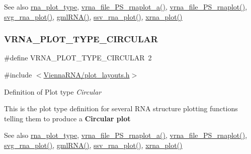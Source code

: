 \begin{DoxySeeAlso}{See also}
\hyperlink{group__plotting__utils_ga5964c4581431b098b80027d6e14dcdd4}{rna\+\_\+plot\+\_\+type}, \hyperlink{plot__structure_8h_a139a31dd0ba9fc6612431f67de901c31}{vrna\+\_\+file\+\_\+\+P\+S\+\_\+rnaplot\+\_\+a()}, \hyperlink{plot__structure_8h_abdc8f6548ba4a3bc3cd868ccbcfdb86a}{vrna\+\_\+file\+\_\+\+P\+S\+\_\+rnaplot()}, \hyperlink{plot__structure_8h_ae7853539b5df98f294b4af434e979304}{svg\+\_\+rna\+\_\+plot()}, \hyperlink{plot__structure_8h_a70834bc8c0aad4fe6824ff76ccb8f329}{gml\+R\+N\+A()}, \hyperlink{plot__structure_8h_add368528755f9a830727b680243541df}{ssv\+\_\+rna\+\_\+plot()}, \hyperlink{plot__structure_8h_a2f6d5953e6a323df898896b8d6614483}{xrna\+\_\+plot()} 
\end{DoxySeeAlso}
\mbox{\label{group__plotting__utils_ga8c9eac631348da92136c8363ecdd9fb9}} 
\subsubsection{\texorpdfstring{V\+R\+N\+A\+\_\+\+P\+L\+O\+T\+\_\+\+T\+Y\+P\+E\+\_\+\+C\+I\+R\+C\+U\+L\+AR}{VRNA\_PLOT\_TYPE\_CIRCULAR}}
{\footnotesize\ttfamily \#define V\+R\+N\+A\+\_\+\+P\+L\+O\+T\+\_\+\+T\+Y\+P\+E\+\_\+\+C\+I\+R\+C\+U\+L\+AR~2}



{\ttfamily \#include $<$\hyperlink{plot__layouts_8h}{Vienna\+R\+N\+A/plot\+\_\+layouts.\+h}$>$}



Definition of Plot type {\itshape Circular} 

This is the plot type definition for several R\+NA structure plotting functions telling them to produce a {\bfseries Circular plot}

\begin{DoxySeeAlso}{See also}
\hyperlink{group__plotting__utils_ga5964c4581431b098b80027d6e14dcdd4}{rna\+\_\+plot\+\_\+type}, \hyperlink{plot__structure_8h_a139a31dd0ba9fc6612431f67de901c31}{vrna\+\_\+file\+\_\+\+P\+S\+\_\+rnaplot\+\_\+a()}, \hyperlink{plot__structure_8h_abdc8f6548ba4a3bc3cd868ccbcfdb86a}{vrna\+\_\+file\+\_\+\+P\+S\+\_\+rnaplot()}, \hyperlink{plot__structure_8h_ae7853539b5df98f294b4af434e979304}{svg\+\_\+rna\+\_\+plot()}, \hyperlink{plot__structure_8h_a70834bc8c0aad4fe6824ff76ccb8f329}{gml\+R\+N\+A()}, \hyperlink{plot__structure_8h_add368528755f9a830727b680243541df}{ssv\+\_\+rna\+\_\+plot()}, \hyperlink{plot__structure_8h_a2f6d5953e6a323df898896b8d6614483}{xrna\+\_\+plot()} 
\end{DoxySeeAlso}



